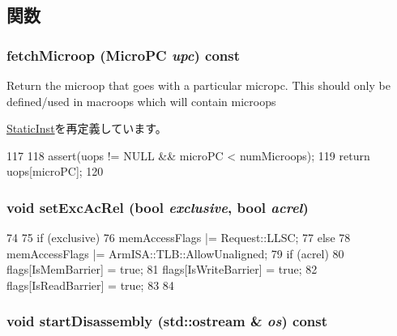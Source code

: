 \subsection{関数}
\hypertarget{classArmISA_1_1Memory64_ae9e7acd6304ee397f1ab470e283ae76b}{
\subsubsection[{fetchMicroop}]{ fetchMicroop ({\bf MicroPC} {\em upc}) const}}
\label{classArmISA_1_1Memory64_ae9e7acd6304ee397f1ab470e283ae76b}
Return the microop that goes with a particular micropc. This should only be defined/used in macroops which will contain microops 

\hyperlink{classStaticInst_aa5c7e6f7323850b84dbf5b8e47856173}{StaticInst}を再定義しています。


\begin{DoxyCode}
117     {
118         assert(uops != NULL && microPC < numMicroops);
119         return uops[microPC];
120     }
\end{DoxyCode}
\hypertarget{classArmISA_1_1Memory64_a991fca7089593d982952f72e58aa291f}{
\subsubsection[{setExcAcRel}]{\setlength{\rightskip}{0pt plus 5cm}void setExcAcRel (bool {\em exclusive}, \/  bool {\em acrel})}}
\label{classArmISA_1_1Memory64_a991fca7089593d982952f72e58aa291f}



\begin{DoxyCode}
74 {
75     if (exclusive)
76         memAccessFlags |= Request::LLSC;
77     else
78         memAccessFlags |= ArmISA::TLB::AllowUnaligned;
79     if (acrel) {
80         flags[IsMemBarrier] = true;
81         flags[IsWriteBarrier] = true;
82         flags[IsReadBarrier] = true;
83     }
84 }
\end{DoxyCode}
\hypertarget{classArmISA_1_1Memory64_aceb6ce0f36dfd65e30eb9ba0b36ed543}{
\subsubsection[{startDisassembly}]{\setlength{\rightskip}{0pt plus 5cm}void startDisassembly (std::ostream \& {\em os}) const}}
\label{classArmISA_1_1Memory64_aceb6ce0f36dfd65e30eb9ba0b36ed543}



